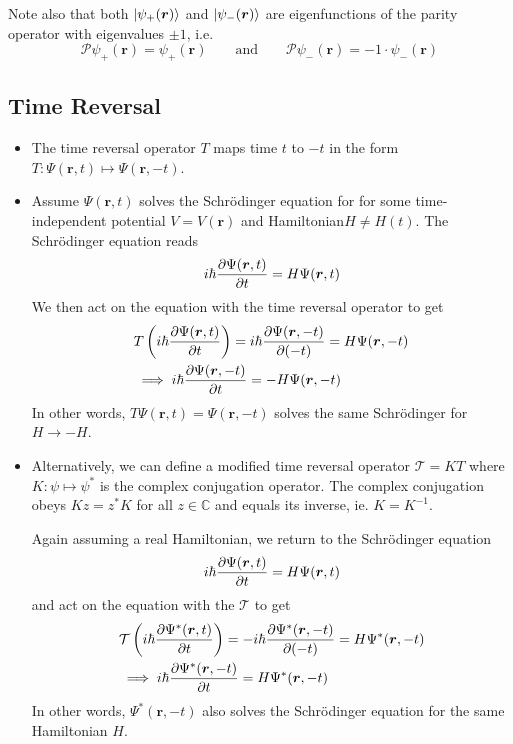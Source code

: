 \documentclass[11pt, a4paper]{article}
\newcommand{\eqtext}[1]{\qquad \text{#1} \qquad}
\newcommand{\Schro}{Schr\"{o}dinger\xspace}
\newcommand{\Ham}{Hamiltonian\xspace}
\renewcommand{\vec}[1]{\bm{#1}}  %
\renewcommand{\r}{\vec{r}}  %
\newcommand{\T}{\mathcal{T}}  %
\newcommand{\Par}{\mathcal{P}}  %
\newcommand{\p}{\psi}  %
\renewcommand{\P}{\Psi}  %
\renewcommand{\k}[1]{\ket{#1}}
\begin{document}
\begin{itemize}
	Note also that both $  \ket{\p_{+}(\r)} $ and $ \k{\p_{-}(\r)} $ are eigenfunctions of the parity operator with eigenvalues $ \pm 1 $, i.e.
	\begin{equation*}
		\Par \p_{+}(\r) =  \p_{+}(\r) \eqtext{and} \Par \p_{-}(\r) =  -1 \cdot \p_{-}(\r)
	\end{equation*}
	
\end{itemize}

\subsection{Time Reversal}
\begin{itemize}
	\item The time reversal operator $ T $ maps time $ t $ to $ -t $ in the form $ T: \P(\r, t) \mapsto \P(\r, -t) $.
	
	\item Assume $ \P(\r, t) $ solves the \Schro equation for for some time-independent potential $ V = V(\r) $ and \Ham $ H \neq H(t) $. The \Schro equation reads
	\begin{equation*}
		i \hbar \pdv{\P(\r, t)}{t} = H \P(\r, t)
	\end{equation*}
	We then act on the equation with the time reversal operator to get
	\begin{align*}
		& T\left(i \hbar \pdv{\P(\r, t)}{t}\right) = i \hbar \pdv{\P(\r, -t)}{(-t)} = H \P(\r, -t)  \\
		& \implies i \hbar \pdv{\P(\r, -t)}{t} = -H \P(\r, -t) 
	\end{align*}
	In other words, $ T\P(\r, t) = \P(\r, -t) $ solves the same \Schro for $ H \to - H $.
	
	\item Alternatively, we can define a modified time reversal operator $ \T = KT $ where $ K : \psi \mapsto \psi^{*} $ is the complex conjugation operator. The complex conjugation obeys $ K z = z^{*}K $ for all $ z \in \mathbb{C} $ and equals its inverse, ie. $ K = K^{-1} $. 
	
	Again assuming a real Hamiltonian, we return to the \Schro equation
	\begin{equation*}
		i \hbar \pdv{\P(\r, t)}{t} = H \P(\r, t) 
	\end{equation*}
	and act on the equation with the $ \T $ to get
	\begin{align*}
		& \T\left(i \hbar \pdv{\P^{*}(\r, t)}{t}\right) = -i \hbar \pdv{\P^{*}(\r, -t)}{(-t)} = H \P^{*}(\r, -t) \\
		& \implies i \hbar \pdv{\P^{*}(\r, -t)}{t} = H \P^{*}(\r, -t) 
	\end{align*}
	In other words, $ \P^{*}(\r, -t) $ also solves the \Schro equation for the same Hamiltonian $ H $. 
	

\end{itemize}
\end{document}
